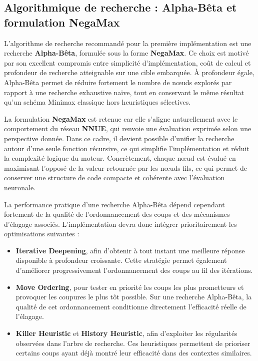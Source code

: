 \documentclass[11pt, a4paper]{article}
\begin{document}
\vspace{0.4em}
\subsection{Algorithmique de recherche : Alpha-Bêta et formulation NegaMax}
\vspace{0.2em}

L'algorithme de recherche recommandé pour la première implémentation est une recherche \textbf{Alpha-Bêta}, formulée sous la forme \textbf{NegaMax}. Ce choix est motivé par son excellent compromis entre simplicité d'implémentation, coût de calcul et profondeur de recherche atteignable sur une cible embarquée. À profondeur égale, Alpha-Bêta permet de réduire fortement le nombre de nœuds explorés par rapport à une recherche exhaustive naïve, tout en conservant le même résultat qu'un schéma Minimax classique hors heuristiques sélectives.

La formulation \textbf{NegaMax} est retenue car elle s'aligne naturellement avec le comportement du réseau \textbf{NNUE}, qui renvoie une évaluation exprimée selon une perspective donnée. Dans ce cadre, il devient possible d'unifier la recherche autour d'une seule fonction récursive, ce qui simplifie l'implémentation et réduit la complexité logique du moteur. Concrètement, chaque nœud est évalué en maximisant l'opposé de la valeur retournée par les nœuds fils, ce qui permet de conserver une structure de code compacte et cohérente avec l'évaluation neuronale.

La performance pratique d'une recherche Alpha-Bêta dépend cependant fortement de la qualité de l'ordonnancement des coups et des mécanismes d'élagage associés. L'implémentation devra donc intégrer prioritairement les optimisations suivantes :
\begin{itemize}
    \item \textbf{Iterative Deepening}, afin d'obtenir à tout instant une meilleure réponse disponible à profondeur croissante. Cette stratégie permet également d'améliorer progressivement l'ordonnancement des coups au fil des itérations.
    \item \textbf{Move Ordering}, pour tester en priorité les coups les plus prometteurs et provoquer les coupures le plus tôt possible. Sur une recherche Alpha-Bêta, la qualité de cet ordonnancement conditionne directement l'efficacité réelle de l'élagage.
    \item \textbf{Killer Heuristic} et \textbf{History Heuristic}, afin d'exploiter les régularités observées dans l'arbre de recherche. Ces heuristiques permettent de prioriser certains coups ayant déjà montré leur efficacité dans des contextes similaires.
\end{itemize}
\end{document}
